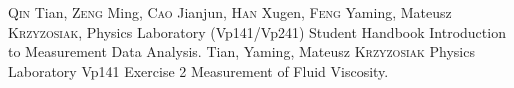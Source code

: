 \begin{thebibliography}{99}
     \textsc{Qin} Tian, \textsc{Zeng} Ming, \textsc{Cao} Jianjun, \textsc{Han} Xugen, \textsc{Feng} Yaming, Mateusz \textsc{Krzyzosiak}, Physics Laboratory (Vp141/Vp241) Student Handbook Introduction to Measurement Data Analysis.
      Tian,  Yaming, Mateusz \textsc{Krzyzosiak} Physics Laboratory Vp141 Exercise 2 Measurement of Fluid Viscosity.
\end{thebibliography}